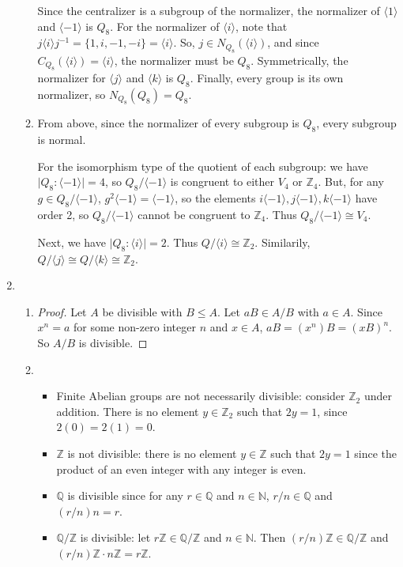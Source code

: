 \documentclass[11pt, letterpaper]{article}
\begin{document}
\begin{enumerate}
\begin{enumerate}
    Since the centralizer is a subgroup of the normalizer, the normalizer of $\langle 1 \rangle$ and $\langle -1 \rangle$ is $Q_8$. For the normalizer of $\langle i \rangle$, note that $j \langle i \rangle j^{-1} = \lbrace 1, i, -1, -i \rbrace = \langle i \rangle$. So, $j \in N_{Q_8}( \langle i \rangle)$, and since $C_{Q_8}(\langle i \rangle) = \langle i \rangle$, the normalizer must be $Q_8$. Symmetrically, the normalizer for $\langle j \rangle$ and $\langle k \rangle$ is $Q_8$. Finally, every group is its own normalizer, so $N_{Q_8}(Q_8) = Q_8$.
    
    \item From above, since the normalizer of every subgroup is $Q_8$, every subgroup is normal.
    
    For the isomorphism type of the quotient of each subgroup: we have $\vert Q_8 : \langle -1 \rangle \vert = 4$, so $Q_8/\langle -1 \rangle$ is congruent to either $V_4$ or $\mathbb Z_4$. But, for any $g \in Q_8/\langle -1 \rangle$, $g^2\langle -1 \rangle = \langle -1 \rangle$, so the elements $i\langle -1 \rangle, j \langle -1 \rangle, k \langle -1 \rangle$ have order 2, so $Q_8/\langle -1 \rangle$ cannot be congruent to $\mathbb Z_4$. Thus $Q_8/\langle -1 \rangle \cong V_4$.

    Next, we have $\vert Q_8 : \langle i \rangle \vert = 2$. Thus $Q/\langle i \rangle \cong \mathbb Z_2$. Similarily, $Q/\langle j \rangle \cong Q/\langle k \rangle \cong \mathbb Z_2$.
  \end{enumerate}
  \item \begin{enumerate}
    \item \begin{proof}
      Let $A$ be divisible with $B \leq A$. Let $aB \in A/B$ with $a \in A$. Since $x^n = a$ for some non-zero integer $n$ and $x \in A$, $aB = (x^n)B = (xB)^n$. So $A/B$ is divisible.
    \end{proof}
    \item \begin{itemize}
      \item Finite Abelian groups are not necessarily divisible: consider $\mathbb Z_2$ under addition. There is no element $y \in \mathbb Z_2$ such that $2y = 1$, since $2(0) = 2(1) = 0$.
      \item $\mathbb Z$ is not divisible: there is no element $y \in \mathbb Z$ such that $2y = 1$ since the product of an even integer with any integer is even.
      \item $\mathbb Q$ is divisible since for any $r \in \mathbb Q$ and $n \in \mathbb N$, $r/n \in \mathbb Q$ and $(r/n)n = r$.
      \item $\mathbb Q/\mathbb Z$ is divisible: let $r\mathbb Z \in \mathbb Q/\mathbb Z$ and $n \in \mathbb N$. Then $(r/n)\mathbb Z \in \mathbb Q/\mathbb Z$ and $(r/n)\mathbb Z \cdot n\mathbb Z = r \mathbb Z$.
    \end{itemize}
  \end{enumerate}


\end{enumerate}
\end{document}
